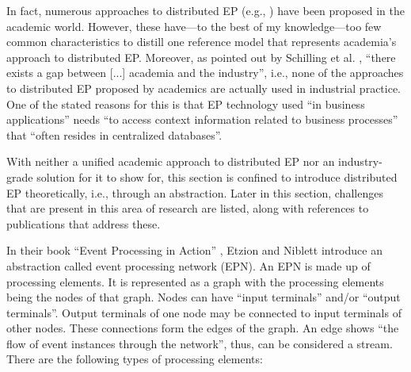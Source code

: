\documentclass[article, 10pt, type=bsc, colorback, accentcolor=tud8b, parskip=half, bibliography=totocnumbered]{tudthesis}
\begin{document}
In fact, numerous approaches to distributed EP (e.g., \cite{Schilling:2010:DHE:1827418.1827453, 792159, Pietzuch:2003:FEC:1515915.1515921, Pietzuch:2003:FEC:1515915.1515921, 1203579, stratified, Farroukh:2009:PEP:1619258.1619269, Khandekar:2009:COS:1656980.1657002, Hirzel:2012:PCP:2335484.2335506, Ottenwalder:2013:MOM:2488222.2488265}) have been proposed in the academic world.
However, these have---to the best of my knowledge---too few common characteristics to distill one reference model that represents academia's approach to distributed EP.
Moreover, as pointed out by Schilling et al. \cite{Schilling:2010:DHE:1827418.1827453}, ``there exists a gap between [...] academia and the industry'', i.e., none of the approaches to distributed EP proposed by academics are actually used in industrial practice.
One of the stated reasons for this is that EP technology used ``in business applications'' needs ``to access context information related to business processes'' that ``often resides in centralized databases''.

With neither a unified academic approach to distributed EP nor an industry-grade solution for it to show for, this section is confined to introduce distributed EP theoretically, i.e., through an abstraction.
Later in this section, challenges that are present in this area of research are listed, along with references to publications that address these.

In their book ``Event Processing in Action'' \cite{Etzion:2010:EPA:1894960}, Etzion and Niblett introduce an abstraction called event processing network (EPN).
An EPN is made up of processing elements.
It is represented as a graph with the processing elements being the nodes of that graph.
Nodes can have ``input terminals'' and/or ``output terminals''.
Output terminals of one node may be connected to input terminals of other nodes.
These connections form the edges of the graph.
An edge shows ``the flow of event instances through the network'', thus, can be considered a stream.
There are the following types of processing elements:
\end{document}
